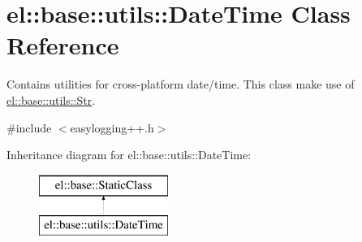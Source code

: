 \hypertarget{classel_1_1base_1_1utils_1_1_date_time}{}\section{el\+:\+:base\+:\+:utils\+:\+:Date\+Time Class Reference}
\label{classel_1_1base_1_1utils_1_1_date_time}


Contains utilities for cross-\/platform date/time. This class make use of \hyperlink{classel_1_1base_1_1utils_1_1_str}{el\+::base\+::utils\+::\+Str}.  




{\ttfamily \#include $<$easylogging++.\+h$>$}

Inheritance diagram for el\+:\+:base\+:\+:utils\+:\+:Date\+Time\+:\begin{figure}[H]
\begin{center}
\leavevmode
\includegraphics[height=2.000000cm]{classel_1_1base_1_1utils_1_1_date_time}
\end{center}
\end{figure}

